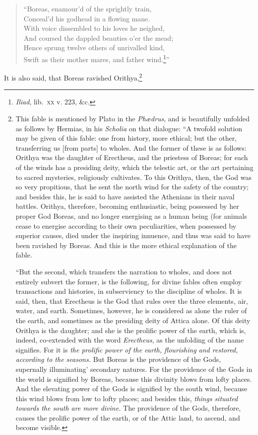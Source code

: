 \documentclass[12pt]{article}
\begin{document}
\begin{verse}
``Boreas, enamour'd of the sprightly train,\\
Conceal'd his godhead in a flowing mane.\\
With voice dissembled to his loves he neighed,\\
And coursed the dappled beauties o'er the mead;\\
Hence sprung twelve others of unrivalled kind,\\
Swift as their mother mares, and father wind.\footnote{\textit{Iliad},
lib.~\textsc{xx} v. 223, \&c.}''
\end{verse}

\noindent It is also said, that Boreas ravished Orithya,\footnote{This fable is
mentioned by Plato in the \textit{Ph{\ae}drus}, and is beautifully unfolded as
follows by Hermias, in his \textit{Scholia} on that dialogue: ``A twofold
solution may be given of this fable: one from history, more ethical; but the
other, transferring us [from parts] to wholes. And the former of these is as
follows: Orithya was the daughter of Erectheus, and the priestess of Boreas;
for each of the winds has a presiding deity, which the telestic art, or the art
pertaining to sacred mysteries, religiously cultivates. To this Orithya, then,
the God was so very propitious, that he sent the north wind for the safety of
the country; and besides this, he is said to have assisted the Athenians in
their naval battles. Orithya, therefore, becoming enthusiastic, being possessed
by her proper God Boreas, and no longer energising as a human being (for
animals cease to energise according to their own peculiarities, when possessed
by superior causes, died under the inspiring innuence, and thus was said to
have been ravished by Boreas. And this is the more ethical explanation of the
fable.

``But the second, which transfers the narration to wholes, and does not
entirely subvert the former, is the following, for divine fables often employ
transactions and histories, in subserviency to the discipline of wholes. It is
said, then, that Erectheus is the God that rules over the three elements, air,
water, and earth. Sometimes, however, he is considered as alone the ruler of
the earth, and sometimes as the presiding deity of Attica alone. Of this deity
Orithya is the daughter; and she is the prolific power of the earth, which is,
indeed, co-extended with the word \textit{Erectheus,} as the unfolding of the
name signifies. For it is \textit{the prolific power of the earth, flourishing
and restored, according to the seasons.} But Boreas is the providence of the
Gods, supernally illuminating' secondary natures. For the providence of the
Gods in the world is signified by Boreas, because this divinity blows from
lofty places. And the elevating power of the Gods is signified by the south
wind, because this wind blows from low to lofty places; and besides this,
\textit{things situated towards the south are more divine.} The providence of
the Gods, therefore, causes the prolific power of the earth, or of the Attic
land, to ascend, and become visible.

}
\end{document}
